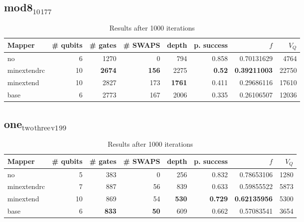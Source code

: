 \documentclass[11pt]{article}
\begin{document}
\subsection{mod8\(_{\text{10}}\)\(_{\text{177}}\)}
\label{sec:orgb672b56}
\begin{table}[H]
\caption{\label{tab:org0dbb040}
Results after 1000 iterations}
\centering
\small
\begin{tabular}{lrrrrrrr}
\hline
Mapper & \# qubits & \# gates & \# SWAPS & depth & p. success & \(f\) & \(V_Q\)\\
\hline
no & 6 & 1270 & 0 & 794 & 0.858 & 0.70131629 & 4764\\
\hline
minextendrc & 10 & \textbf{2674} & \textbf{156} & 2275 & \textbf{0.52} & \textbf{0.39211003} & 22750\\
minextend & 10 & 2827 & 173 & \textbf{1761} & 0.411 & 0.29686116 & 17610\\
base & 6 & 2773 & 167 & 2006 & 0.335 & 0.26106507 & 12036\\
\hline
\end{tabular}
\end{table}
\subsection{one\(_{\text{two}}\)\(_{\text{three}}\)\(_{\text{v1}}\)\(_{\text{99}}\)}
\label{sec:org926a959}
\begin{table}[H]
\caption{\label{tab:orgbf9cc33}
Results after 1000 iterations}
\centering
\small
\begin{tabular}{lrrrrrrr}
\hline
Mapper & \# qubits & \# gates & \# SWAPS & depth & p. success & \(f\) & \(V_Q\)\\
\hline
no & 5 & 383 & 0 & 256 & 0.832 & 0.78653106 & 1280\\
\hline
minextendrc & 7 & 887 & 56 & 839 & 0.633 & 0.59855522 & 5873\\
minextend & 10 & 869 & 54 & \textbf{530} & \textbf{0.729} & \textbf{0.62135956} & 5300\\
base & 6 & \textbf{833} & \textbf{50} & 609 & 0.662 & 0.57083541 & 3654\\
\hline
\end{tabular}
\end{table}
\end{document}
